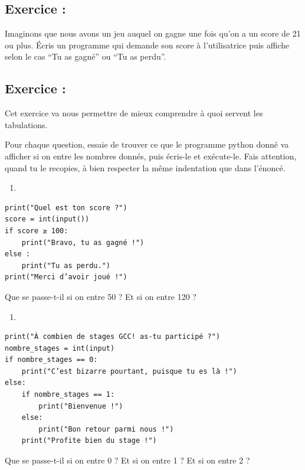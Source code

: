\documentclass[a4paper,french,11pt]{article}
\begin{document}
\hypertarget{exercice-6}{%
\subsection{Exercice :}\label{exercice-6}}

Imaginons que nous avons un jeu auquel on gagne une fois qu'on a un
score de 21 ou plus. Écris un programme qui demande son score à
l'utilisatrice puis affiche selon le cas ``Tu as gagné'' ou ``Tu as
perdu''.

\hypertarget{exercice-7}{%
\subsection{Exercice :}\label{exercice-7}}

Cet exercice va nous permettre de mieux comprendre à quoi servent les
tabulations.

Pour chaque question, essaie de trouver ce que le programme python donné
va afficher si on entre les nombres donnés, puis écris-le et exécute-le.
Fais attention, quand tu le recopies, à bien respecter la même
indentation que dans l'énoncé.

\begin{enumerate}
\def\labelenumi{\arabic{enumi}.}
\item
\end{enumerate}

\begin{verbatim}
print("Quel est ton score ?")
score = int(input())
if score ≥ 100:
    print("Bravo, tu as gagné !")
else :
    print("Tu as perdu.")
print("Merci d’avoir joué !")
\end{verbatim}

Que se passe-t-il si on entre 50 ? Et si on entre 120 ?

\begin{enumerate}
\def\labelenumi{\arabic{enumi}.}
\setcounter{enumi}{1}
\item
\end{enumerate}

\begin{verbatim}
print("À combien de stages GCC! as-tu participé ?")
nombre_stages = int(input)
if nombre_stages == 0:
    print("C’est bizarre pourtant, puisque tu es là !")
else:
    if nombre_stages == 1:
        print("Bienvenue !")
    else:
        print("Bon retour parmi nous !")
    print("Profite bien du stage !")
\end{verbatim}

Que se passe-t-il si on entre 0 ? Et si on entre 1 ? Et si on entre 2 ?
\end{document}
